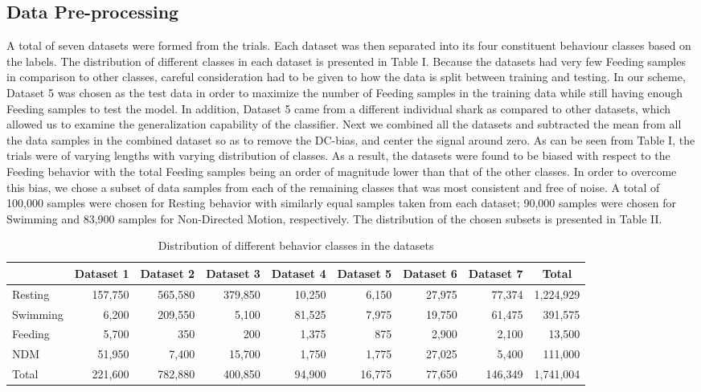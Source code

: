 \documentclass[conference]{IEEEtran}
\begin{document}
\subsection{Data Pre-processing}
A total of seven datasets were formed from the trials. Each dataset was then separated into its four constituent behaviour classes based on the labels. The distribution of different classes in each dataset is presented in Table I. Because the datasets had very few Feeding samples in comparison to other classes, careful consideration had to be given to how the data is split between training and testing. In our scheme, Dataset 5 was chosen as the test data in order to maximize the number of Feeding samples in the training data while still having enough Feeding samples to test the model.  In addition, Dataset 5 came from a different individual shark as compared to other datasets, which allowed us to examine the generalization capability of the classifier.
Next we combined all the datasets and subtracted the mean from all the data samples in the combined dataset so as to remove the DC-bias, and center the signal around zero. 
As can be seen from Table I, the trials were of varying lengths with varying distribution of classes. As a result, the datasets were found to be biased with respect to the Feeding behavior with the total Feeding samples being an order of magnitude lower than that of the other classes. In order to overcome this bias, we chose a subset of data samples from each of the remaining classes that was most consistent and free of noise. A total of 100,000 samples were chosen for Resting behavior with similarly equal samples taken from each dataset; 90,000 samples were chosen for Swimming and 83,900 samples for Non-Directed Motion, respectively. The distribution of the chosen subsets is presented in Table II.
\begin{table}[tp!]
	\centering
	\caption{Distribution of different behavior classes in the datasets}
	\begin{tabular}{l r r r r r r r r}
	\hline
	& \textbf{Dataset 1} & \textbf{Dataset 2} & \textbf{Dataset 3} & \textbf{Dataset 4} & \textbf{Dataset 5} & \textbf{Dataset 6} & \textbf{Dataset 7} & \multicolumn{1}{c}{\textbf{Total}}\\
	\hline
	Resting & 157,750 & 565,580 & 379,850 & 10,250 & 6,150 & 27,975 & 77,374 & 1,224,929 \\
	Swimming & 6,200 & 209,550 & 5,100 & 81,525 & 7,975 & 19,750 & 61,475 & 391,575 \\
	Feeding & 5,700 & 350 & 200 & 1,375 & 875 & 2,900 & 2,100 & 13,500 \\
	NDM & 51,950 & 7,400 & 15,700 & 1,750 & 1,775 & 27,025 & 5,400 & 111,000 \\
	Total & 221,600 & 782,880 & 400,850 & 94,900 & 16,775 & 77,650 & 146,349 & 1,741,004 \\
	\hline
	\end{tabular}
	\label{}
\end{table}
\end{document}
